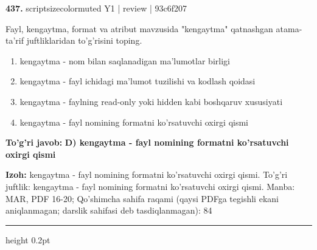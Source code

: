 \documentclass[10pt,a4paper]{article}
\begin{document}
{\bfseries\sffamily\color{ink} 437.} {scriptsizecolor{muted} Y1 | review | 93c6f207}
\par
Fayl, kengaytma, format va atribut mavzusida "kengaytma" qatnashgan atama-ta'rif juftliklaridan to'g'risini toping.
\begin{enumerate}[label=\Alph*),leftmargin=9mm]
\item kengaytma - nom bilan saqlanadigan ma'lumotlar birligi
\item kengaytma - fayl ichidagi ma'lumot tuzilishi va kodlash qoidasi
\item kengaytma - faylning read-only yoki hidden kabi boshqaruv xususiyati
\item kengaytma - fayl nomining formatni ko'rsatuvchi oxirgi qismi
\end{enumerate}
\begin{tcolorbox}[enhanced,breakable,colback=teal!4,colframe=teal!60!black,boxrule=0.45pt,arc=1.2mm,left=2.7mm,right=2.7mm,top=1.8mm,bottom=1.8mm,before skip=2mm,after skip=2mm]
{\bfseries\sffamily\color{teal}To'g'ri javob:} \textbf{D) kengaytma - fayl nomining formatni ko'rsatuvchi oxirgi qismi}
\par\smallskip
{\bfseries Izoh:} kengaytma - fayl nomining formatni ko'rsatuvchi oxirgi qismi. To'g'ri juftlik: kengaytma - fayl nomining formatni ko'rsatuvchi oxirgi qismi. Manba: MAR, PDF 16-20; Qo'shimcha sahifa raqami (qaysi PDFga tegishli ekani aniqlanmagan; darslik sahifasi deb tasdiqlanmagan): 84
\end{tcolorbox}
\vspace{2mm}\hrule height 0.2pt\vspace{3mm}
\end{document}
